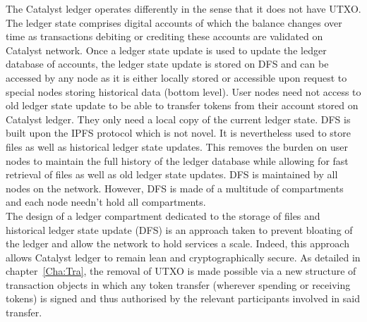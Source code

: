 \textcolor{bulg}{The Catalyst ledger operates differently in the sense that it does not have UTXO. The ledger state comprises digital accounts of which the balance changes over time as transactions debiting or crediting these accounts are validated on Catalyst network. Once a ledger state update is used to update the ledger database of accounts, the ledger state update is stored on DFS and can be accessed by any node as it is either locally stored or accessible upon request to special nodes storing historical data (bottom level). User nodes need not access to old ledger state update to be able to transfer tokens from their account stored on Catalyst ledger. They only need  a local copy of the current ledger state. DFS is built upon the IPFS protocol which is not novel. It is nevertheless used to store files as well as historical ledger state updates. This removes the burden on user nodes to maintain the full history of the ledger database while allowing for fast retrieval of files as well as old ledger state updates. DFS is maintained by all nodes on the network. However, DFS is made of a multitude of compartments and each node needn’t hold all compartments.}\\

\textcolor{bulg}{The design of a ledger compartment dedicated to the storage of files and historical ledger state update (DFS) is an approach taken to prevent bloating of the ledger and allow the network to hold services a scale. Indeed, this approach allows Catalyst ledger to remain lean and cryptographically secure. As detailed in chapter~\ref{Cha:Tra}, the removal of UTXO is made possible via a new structure of transaction objects in which any token transfer (wherever spending or receiving tokens) is signed and thus authorised by the relevant participants involved in said transfer.}
